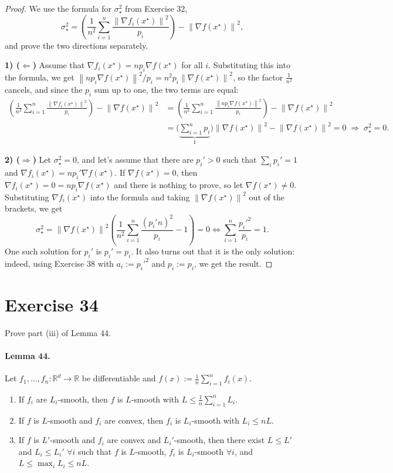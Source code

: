 \documentclass[11pt,a4paper]{article}
\newcommand{\R}{\mathbb{R}}
\newcommand{\norm}[1]{\left\| #1 \right\|}
\newcommand{\xs}{x^\star}
\begin{document}
\begin{proof}
We use the formula for $\sigma_\star^2$ from Exercise 32,
\[
  \sigma_\star^2 = \left(\frac{1}{n^2}\sum_{i=1}^n \frac{\norm{\nabla f_i(\xs)}^2}{p_i}\right) - \norm{\nabla f(\xs)}^2 ,
\]
and prove the two directions separately.

\medskip
\noindent\textbf{1) ($\Leftarrow$)}
Assume that $\nabla f_i(\xs) = np_i\nabla f(\xs)$ for all $i$. Substituting this into the formula,
we get $\norm{np_i\nabla f(\xs)}^2/p_i = n^2p_i\norm{\nabla f(\xs)}^2$, so the factor $\frac{1}{n^2}$
cancels, and since the $p_i$ sum up to one, the two terms are equal:
\begin{align*}
  \left(\frac{1}{n^2}\sum_{i=1}^n \frac{\norm{\nabla f_i(\xs)}^2}{p_i}\right) - \norm{\nabla f(\xs)}^2
  &= \left(\frac{1}{n^2}\sum_{i=1}^n \frac{\norm{np_i\nabla f(\xs)}^2}{p_i}\right) - \norm{\nabla f(\xs)}^2 \\
  &= \Biggl(\underbrace{\sum_{i=1}^n p_i}_{1}\Biggr)\norm{\nabla f(\xs)}^2 - \norm{\nabla f(\xs)}^2 = 0
  \;\Rightarrow\; \sigma_\star^2 = 0 .
\end{align*}

\medskip
\noindent\textbf{2) ($\Rightarrow$)}
Let $\sigma_\star^2 = 0$, and let's assume that there are $p_i' > 0$ such that $\sum_i p_i' = 1$ and
$\nabla f_i(\xs) = np_i'\nabla f(\xs)$. If $\nabla f(\xs) = 0$, then $\nabla f_i(\xs) = 0 = np_i\nabla f(\xs)$
and there is nothing to prove, so let $\nabla f(\xs) \neq 0$. Substituting $\nabla f_i(\xs)$ into the
formula and taking $\norm{\nabla f(\xs)}^2$ out of the brackets, we get
\[
  \sigma_\star^2 = \norm{\nabla f(\xs)}^2\left(\frac{1}{n^2}\sum_{i=1}^n \frac{(p_i'n)^2}{p_i} - 1\right) = 0
  \iff \sum_{i=1}^n \frac{p_i'^2}{p_i} = 1 .
\]
One such solution for $p_i'$ is $p_i' = p_i$. It also turns out that it is the only solution:
indeed, using Exercise 38 with $a_i := p_i'^2$ and $p_i := p_i$, we get the result.
\end{proof}

\section*{Exercise 34}

Prove part (iii) of Lemma 44.

\paragraph{Lemma 44.}
Let $f_1,\dots,f_n : \R^d \to \R$ be differentiable and $f(x) := \frac{1}{n}\sum_{i=1}^n f_i(x)$.
\begin{enumerate}
  \item[(i)] If $f_i$ are $L_i$-smooth, then $f$ is $L$-smooth with $L \le \frac{1}{n}\sum_{i=1}^n L_i$.
  \item[(ii)] If $f$ is $L$-smooth and $f_i$ are convex, then $f_i$ is $L_i$-smooth with $L_i \le nL$.
  \item[(iii)] If $f$ is $L'$-smooth and $f_i$ are convex and $L_i'$-smooth, then there exist
    $L \le L'$ and $L_i \le L_i'$ $\forall i$ such that $f$ is $L$-smooth, $f_i$ is $L_i$-smooth
    $\forall i$, and $L \le \max_i L_i \le nL$.
\end{enumerate}
\end{document}

